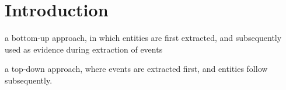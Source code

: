 \section{Introduction}




a bottom-up approach, in which entities are first extracted, and subsequently used as evidence during extraction of events

a top-down approach, where events are extracted first, and entities follow subsequently. 
